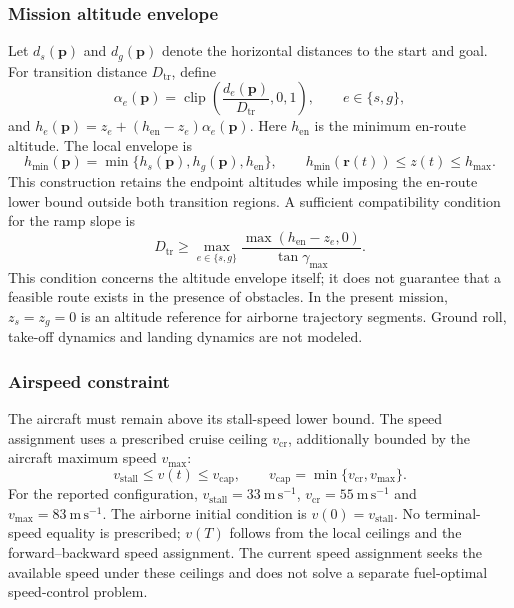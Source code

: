 \subsubsection{Mission altitude envelope}
Let $d_s(\mathbf{p})$ and $d_g(\mathbf{p})$ denote the horizontal distances
to the start and goal. For transition distance $D_{\mathrm{tr}}$, define
\begin{equation}
 \alpha_e(\mathbf{p})=\operatorname{clip}
 \left(\frac{d_e(\mathbf{p})}{D_{\mathrm{tr}}},0,1\right),
 \qquad e\in\{s,g\},
 \label{pr:eq:transition}
\end{equation}
and $h_e(\mathbf{p})=z_e+(h_{\mathrm{en}}-z_e)\alpha_e(\mathbf{p})$.
Here $h_{\mathrm{en}}$ is the minimum en-route altitude. The local envelope is
\begin{equation}
 h_{\min}(\mathbf{p})=\min\{h_s(\mathbf{p}),h_g(\mathbf{p}),h_{\mathrm{en}}\},
 \qquad h_{\min}(\mathbf{r}(t))\le z(t)\le h_{\max}.
 \label{pr:eq:altitude}
\end{equation}
This construction retains the endpoint altitudes while imposing the
en-route lower bound outside both transition regions. A sufficient
compatibility condition for the ramp slope is
\begin{equation}
 D_{\mathrm{tr}}\ge
 \max_{e\in\{s,g\}}\frac{\max(h_{\mathrm{en}}-z_e,0)}{\tan\gamma_{\max}}.
 \label{pr:eq:ramp}
\end{equation}
This condition concerns the altitude envelope itself; it does not guarantee
that a feasible route exists in the presence of obstacles. In the present
mission, $z_s=z_g=0$ is an altitude reference for airborne trajectory
segments. Ground roll, take-off dynamics and landing dynamics are not modeled.

\subsubsection{Airspeed constraint}
The aircraft must remain above its stall-speed lower bound. The speed
assignment uses a prescribed cruise ceiling $v_{\mathrm{cr}}$, additionally
bounded by the aircraft maximum speed $v_{\max}$:
\begin{equation}
 v_{\mathrm{stall}}\le v(t)\le v_{\mathrm{cap}},\qquad
 v_{\mathrm{cap}}=\min\{v_{\mathrm{cr}},v_{\max}\}.
 \label{pr:eq:speedcap}
\end{equation}
For the reported configuration, $v_{\mathrm{stall}}=33~\mathrm{m\,s^{-1}}$,
$v_{\mathrm{cr}}=55~\mathrm{m\,s^{-1}}$ and
$v_{\max}=83~\mathrm{m\,s^{-1}}$. The airborne initial condition is
$v(0)=v_{\mathrm{stall}}$. No terminal-speed equality is prescribed;
$v(T)$ follows from the local ceilings and the forward--backward speed
assignment. The current speed assignment seeks the available speed under
these ceilings and does not solve a separate fuel-optimal speed-control problem.

